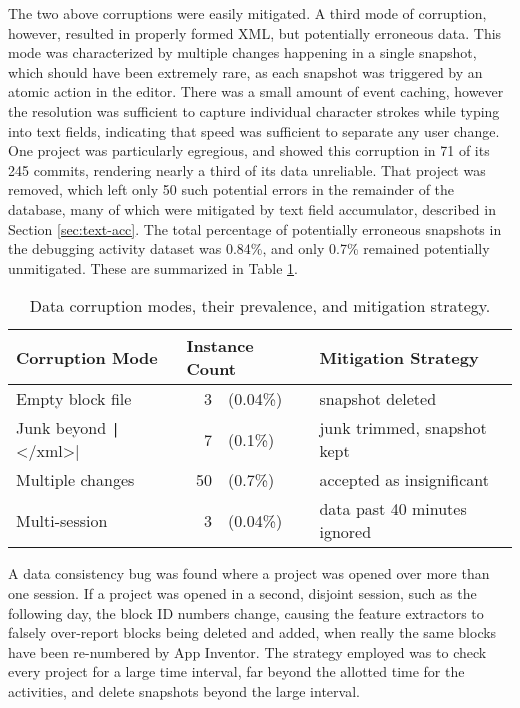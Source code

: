 The two above corruptions were easily mitigated. A third mode of corruption, however, resulted in properly formed XML, but potentially erroneous data. This mode was characterized by multiple changes happening in a single snapshot, which should have been extremely rare, as each snapshot was triggered by an atomic action in the editor. There was a small amount of event caching, %
 however the resolution was sufficient to capture individual character strokes while typing into text fields, indicating that speed was sufficient to separate any user change. One project was particularly egregious, and showed this corruption in 71 of its 245 commits, rendering nearly a third of its data unreliable. That project was removed, which left only 50 such potential errors in the remainder of the database, many of which were mitigated by text field accumulator, described in Section \ref{sec:text-acc}. The total percentage of potentially erroneous snapshots in the debugging activity dataset was 0.84\%, and only 0.7\% remained potentially unmitigated. These are summarized in Table \ref{tab:data-corruption}.

	
\begin{table}
\begin{centering}
	\begin{tabular}{l r l p{5.4cm}}
	Corruption Mode 		& \multicolumn{2}{l}{Instance Count} 		& Mitigation Strategy 			\\ \hline
	Empty block file 						&  3 &(0.04\%) 				& snapshot deleted 						\\
	Junk beyond \texttt|</xml>| 	&  7 &(0.1\%) 				& junk trimmed, snapshot kept 			\\
	Multiple changes 						& 50 &(0.7\%) 				& accepted as insignificant 			\\
	Multi-session 							&  3 &(0.04\%) 				& data past 40 minutes ignored
	\end{tabular}
	\caption[Data corruption modes]{Data corruption modes, their prevalence, and mitigation strategy.}
	\label{tab:data-corruption}
\end{centering}
\end{table}

A data consistency bug was found where a project was opened over more than one session. If a project was opened in a second, disjoint session, such as the following day, the block ID numbers change, causing the feature extractors to falsely over-report blocks being deleted and added, when really the same blocks have been re-numbered by App Inventor. The strategy employed was to check every project for a large time interval, far beyond the allotted time for the activities, and delete snapshots beyond the large interval. %


